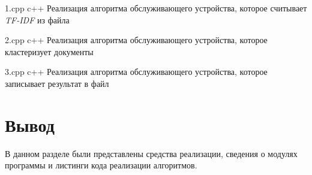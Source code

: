 \clearpage

{1.cpp} %
{c++} %
{Реализация алгоритма обслуживающего устройства, которое считывает \textit{TF-IDF} из файла} %

{2.cpp} %
{c++} %
{Реализация алгоритма обслуживающего устройства, которое кластеризует документы} %

\clearpage
\clearpage
{}
{3.cpp} %
{c++} %
{Реализация алгоритма обслуживающего устройства, которое записывает результат в файл} %

\section *{Вывод}

В данном разделе были представлены средства реализации, сведения о модулях программы и листинги кода реализации алгоритмов.

